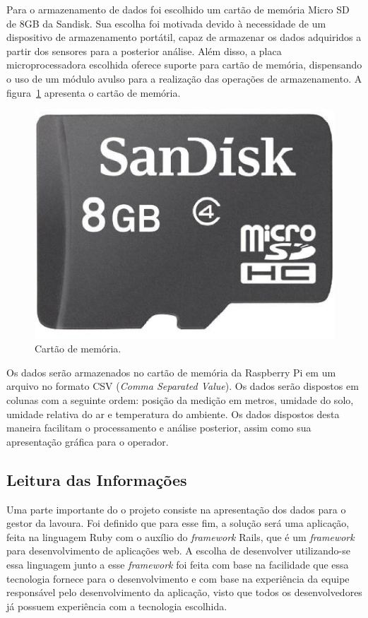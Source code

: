   Para o armazenamento de dados foi escolhido um cartão de memória
  Micro SD de 8GB da Sandisk. Sua escolha foi motivada devido à
  necessidade de um dispositivo de armazenamento portátil, capaz de
  armazenar os dados adquiridos a partir dos sensores para a posterior
  análise. Além disso, a placa microprocessadora escolhida oferece
  suporte para cartão de memória, dispensando o uso de um módulo avulso
  para a realização das operações de armazenamento. A figura~\ref{fig:sdcard}
  apresenta o cartão de memória. 

  \begin{figure}[!htbp]
  \begin{center}
  \includegraphics[width=.5\textwidth]{figuras/sdcard.eps}
  \caption{\label{fig:sdcard}Cartão de memória.}
  \end{center}
  \end{figure}

  Os dados serão armazenados no cartão de memória da Raspberry Pi
  em um arquivo no formato CSV (\textit{Comma Separated Value}). Os dados
  serão dispostos em colunas com a seguinte ordem: posição da medição
  em metros, umidade do solo, umidade relativa do ar e temperatura do
  ambiente.
  Os dados dispostos desta maneira facilitam o processamento e
  análise posterior, assim como sua apresentação gráfica para
  o operador.

  \subsection{Leitura das Informações}

  Uma parte importante do o projeto consiste na apresentação dos
  dados para o gestor da lavoura. Foi definido que para esse fim,
  a solução será uma aplicação, feita na linguagem Ruby com o
  auxílio do \textit{framework} Rails, que é um \textit{framework}
  para desenvolvimento de aplicações web.
  A escolha de desenvolver utilizando-se essa linguagem junto a
  esse \textit{framework} foi feita com base na facilidade que essa
  tecnologia fornece para o desenvolvimento e com base na experiência
  da equipe responsável pelo desenvolvimento da aplicação, visto que
  todos os desenvolvedores já possuem experiência com a tecnologia
  escolhida.
  
